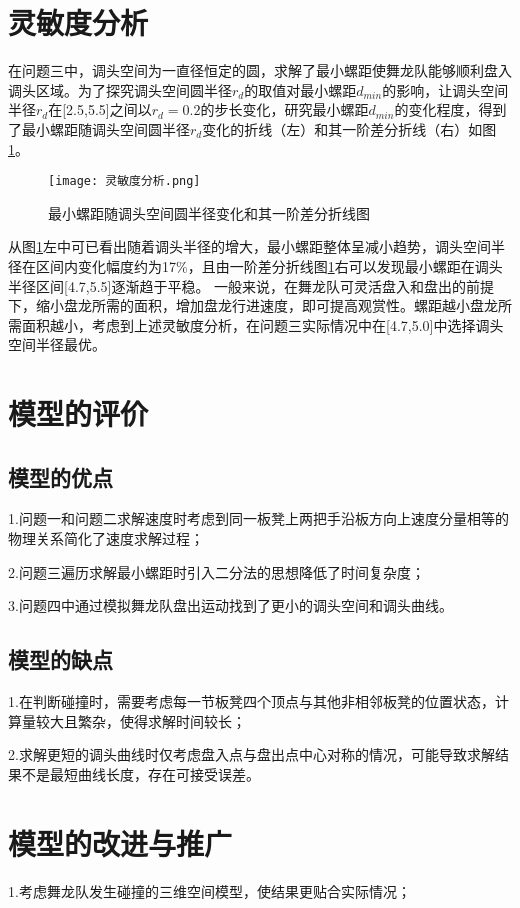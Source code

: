 \documentclass[withoutpreface,bwprint]{cumcmthesis} %
\begin{document}
	\section{灵敏度分析}
	在问题三中，调头空间为一直径恒定的圆，求解了最小螺距使舞龙队能够顺利盘入调头区域。为了探究调头空间圆半径$r_d$的取值对最小螺距$d_{min}$的影响，让调头空间半径$r_d$在[2.5,5.5]之间以$r_d=0.2$的步长变化，研究最小螺距$d_{min}$的变化程度，得到了最小螺距随调头空间圆半径$r_d$变化的折线（左）和其一阶差分折线（右）如图\ref{分析}。
	\begin{figure}[H]
		\centering
		\texttt{[image: 灵敏度分析.png]}
		\caption{最小螺距随调头空间圆半径变化和其一阶差分折线图}
		\label{分析}
	\end{figure}
	从图\ref{分析}左中可已看出随着调头半径的增大，最小螺距整体呈减小趋势，调头空间半径在区间内变化幅度约为17\%，且由一阶差分折线图\ref{分析}右可以发现最小螺距在调头半径区间[4.7,5.5]逐渐趋于平稳。
	一般来说，在舞龙队可灵活盘入和盘出的前提下，缩小盘龙所需的面积，增加盘龙行进速度，即可提高观赏性。螺距越小盘龙所需面积越小，考虑到上述灵敏度分析，在问题三实际情况中在[4.7,5.0]中选择调头空间半径最优。
	\section{模型的评价}
	
	\subsection{模型的优点}
	1.问题一和问题二求解速度时考虑到同一板凳上两把手沿板方向上速度分量相等的物理关系简化了速度求解过程；
	
	2.问题三遍历求解最小螺距时引入二分法的思想降低了时间复杂度；
	
	3.问题四中通过模拟舞龙队盘出运动找到了更小的调头空间和调头曲线。
	
	
	\subsection{模型的缺点}
	1.在判断碰撞时，需要考虑每一节板凳四个顶点与其他非相邻板凳的位置状态，计算量较大且繁杂，使得求解时间较长；
	
	2.求解更短的调头曲线时仅考虑盘入点与盘出点中心对称的情况，可能导致求解结果不是最短曲线长度，存在可接受误差。
	\section{模型的改进与推广}
	1.考虑舞龙队发生碰撞的三维空间模型，使结果更贴合实际情况；
	
\end{document}
